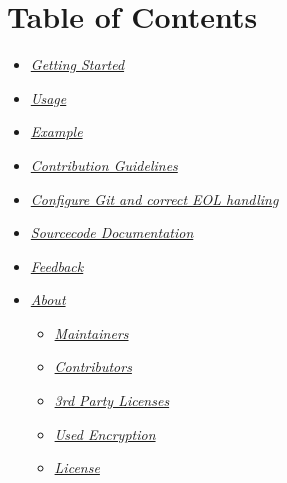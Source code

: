 \documentclass[letterpaper,10pt,english]{sphinxmanual}
\begin{document}
\chapter{Table of Contents}
\label{\detokenize{index:table-of-contents}}\begin{itemize}
\item {} 
\sphinxAtStartPar
{\hyperref[\detokenize{index:getting-started}]{\emph{Getting Started}}}

\item {} 
\sphinxAtStartPar
{\hyperref[\detokenize{index:building-and-testing}]{\emph{Usage}}}

\item {} 
\sphinxAtStartPar
{\hyperref[\detokenize{index:example}]{\emph{Example}}}

\item {} 
\sphinxAtStartPar
{\hyperref[\detokenize{index:contribution-guidelines}]{\emph{Contribution Guidelines}}}

\item {} 
\sphinxAtStartPar
{\hyperref[\detokenize{index:configure-Git-and-correct-EOL-handling}]{\emph{Configure Git and correct EOL
handling}}}

\item {} 
\sphinxAtStartPar
{\hyperref[\detokenize{index:documentation}]{\emph{Sourcecode Documentation}}}

\item {} 
\sphinxAtStartPar
{\hyperref[\detokenize{index:feedback}]{\emph{Feedback}}}

\item {} 
\sphinxAtStartPar
{\hyperref[\detokenize{index:about}]{\emph{About}}}
\begin{itemize}
\item {} 
\sphinxAtStartPar
{\hyperref[\detokenize{index:maintainers}]{\emph{Maintainers}}}

\item {} 
\sphinxAtStartPar
{\hyperref[\detokenize{index:contributors}]{\emph{Contributors}}}

\item {} 
\sphinxAtStartPar
{\hyperref[\detokenize{index:3rd-party-licenses}]{\emph{3rd Party Licenses}}}

\item {} 
\sphinxAtStartPar
{\hyperref[\detokenize{index:used-encryption}]{\emph{Used Encryption}}}

\item {} 
\sphinxAtStartPar
{\hyperref[\detokenize{index:license}]{\emph{License}}}

\end{itemize}

\end{itemize}
\end{document}
